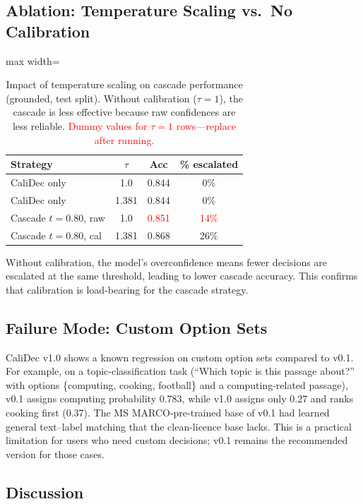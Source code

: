 \documentclass[twocolumn]{ICCKjournal}
\newcommand{\ph}[1]{\textcolor{red}{#1}}
\begin{document}
\subsection{Ablation: Temperature Scaling vs.\ No Calibration}
\label{sec:ablation_temp}
\begin{table}[H]
\caption{Impact of temperature scaling on cascade performance (grounded, test split). Without calibration ($\tau=1$), the cascade is less effective because raw confidences are less reliable. \textcolor{red}{Dummy values for $\tau=1$ rows---replace after running.}}
\label{tab:ablation_temp}
\centering
\small
\begin{adjustbox}{max width=\linewidth}
\begin{tabular}{lccc}
\toprule
\textbf{Strategy} & \textbf{$\tau$} & \textbf{Acc} & \textbf{\% escalated} \\
\midrule
CaliDec only            & 1.0   & 0.844 & 0\% \\
CaliDec only            & 1.381 & 0.844 & 0\% \\
Cascade $t=0.80$, raw   & 1.0   & \ph{0.851} & \ph{14\%} \\
Cascade $t=0.80$, cal   & 1.381 & 0.868 & 26\% \\
\bottomrule
\end{tabular}
\end{adjustbox}
\end{table}

Without calibration, the model's overconfidence means fewer decisions are escalated at the same threshold, leading to lower cascade accuracy. This confirms that calibration is load-bearing for the cascade strategy.

\subsection{Failure Mode: Custom Option Sets}
\label{sec:custom}
CaliDec v1.0 shows a known regression on custom option sets compared to v0.1. For example, on a topic-classification task (``Which topic is this passage about?'' with options \{computing, cooking, football\} and a computing-related passage), v0.1 assigns computing probability 0.783, while v1.0 assigns only 0.27 and ranks cooking first (0.37). The MS MARCO-pre-trained base of v0.1 had learned general text--label matching that the clean-licence base lacks. This is a practical limitation for users who need custom decisions; v0.1 remains the recommended version for those cases.

\subsection{Discussion}
\label{sec:discussion}
\end{document}
